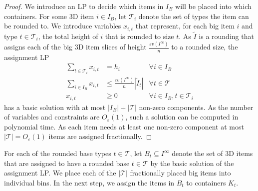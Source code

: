 \documentclass[a4paper,UKenglish,cleveref, autoref, thm-restate]{lipics-v2021}
\newcommand{\eps}{\varepsilon}
\newcommand{\bigy}{big\xspace}
\begin{document}
\begin{proof}
We introduce an LP to decide which items in $I_B$ will be placed into which containers. 
For some 3D item $i \in I_B$, let $\mathcal{T}_i$ denote the set of types the item can be rounded to.
We introduce variables $x_{i,t}$ that represent, for each \bigy item $i$ and type $t \in \mathcal{T}_i$, the total height of $i$ that is rounded to size $t$.
As $\tilde{I}$ is a rounding that assigns each of the big 3D item slices of height $\frac{\eps v(I^{\infty})}{n}$ to a rounded size, the assignment LP
\begin{align*}
    \sum_{t \in \mathcal{T}_i} x_{i,t} &= h_i &\forall i \in I_B\\
    \sum_{i \in I_B} x_{i,t} &\leq \frac{\eps v(I^{\infty})}{n} |\tilde{I}_t|  &\forall t \in \mathcal{T}\\
    x_{i,t} &\geq 0 &\forall i \in I_B, t \in \mathcal{T}_i
\end{align*}
has a basic solution with at most $|I_B| + |\mathcal{T}|$ non-zero components.
As the number of variables and constraints are $O_{\eps}(1)$, such a solution can be computed in polynomial time.
As each item needs at least one non-zero component at most $|\mathcal{T}| = O_{\eps}(1)$ items are assigned fractionally. 
\end{proof}

For each of the rounded base types $t \in \mathcal{T}$, let $B_t \subseteq I^{\infty}$ denote the set of 3D items that are assigned to have a rounded base $t \in \mathcal{T}$ by the basic solution of the assignment LP.  
We place each of the $|\mathcal{T}|$ fractionally placed \bigy items into individual bins.
In the next step, we assign the items in $B_t$ to containers $K_t$.
\end{document}
